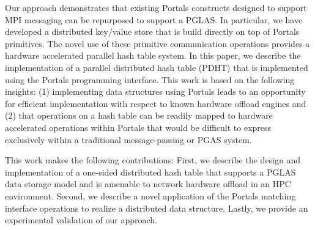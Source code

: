 Our approach demonstrates that existing Portals constructs designed to support
MPI messaging can be repurposed to support a PGLAS.  In particular, we have
developed a distributed
key/value store that is build directly on top of Portals
primitives. The novel use of these primitive communication operations
provides a hardware accelerated parallel hash table system. In this
paper, we describe the implementation of a parallel distributed hash
table (PDHT) that is implemented using the Portals programming
interface. This work is based on the following insights: (1)
implementing data structures using Portals leads to an opportunity for
efficient implementation with respect to known hardware offload
engines and (2) that operations on a hash table can be readily mapped
to hardware accelerated operations within Portals that would be
difficult to express exclusively within a traditional message-passing
or PGAS system.

This work makes the following contributions: First, we describe the
design and implementation of a one-sided distributed hash table that
supports a PGLAS data storage model and
is amenable to network hardware offload in an HPC environment. Second,
we describe a novel application of the Portals matching interface
operations to realize a distributed data structure. Lastly, we provide
an experimental validation of our approach.


